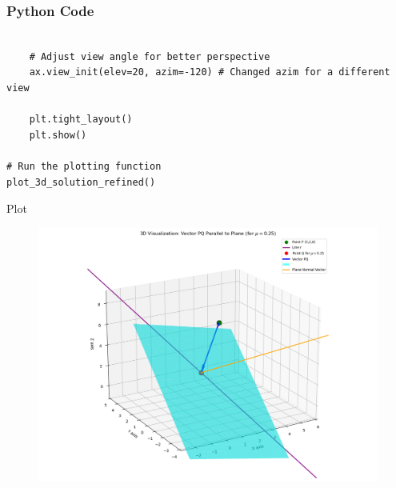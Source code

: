 \documentclass{beamer}
\begin{document}
\begin{frame}[fragile]
    \frametitle{Python Code}
    \begin{lstlisting}

    # Adjust view angle for better perspective
    ax.view_init(elev=20, azim=-120) # Changed azim for a different view

    plt.tight_layout()
    plt.show()

# Run the plotting function
plot_3d_solution_refined()

    \end{lstlisting}
\end{frame}

\begin{frame}{Plot}

\begin{figure}
    \centering
    \includegraphics[width=0.8\linewidth]{Beamer/figs/Plane1.png}
    \caption{}
    \label{fig:placeholder}
\end{figure}

\end{frame}
\end{document}
